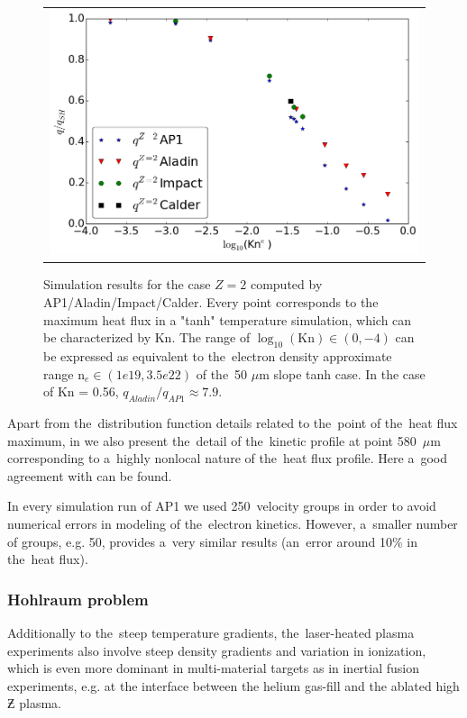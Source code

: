 \begin{figure}[tbh]
  \begin{center}
    \begin{tabular}{c}
      \includegraphics[width=\figscale\textwidth]{Kn_results.png}
    \end{tabular}
  \caption{  
  Simulation results for the case $Z=2$ computed by AP1/Aladin/Impact/Calder.
  Every point corresponds to the maximum heat flux in a "tanh" temperature 
  simulation, which can be characterized by Kn. The range of 
  $\log_{10}(\text{Kn})\in (0, -4)$ can be expressed as equivalent 
  to the~electron density approximate range n$_e \in (1e19, 3.5e22)$ of 
  the~50 $\mu$m slope tanh case. In the case of Kn = 0.56, 
  $q_{Aladin} / q_{AP1}\approx 7.9$.}
  \label{fig:Kn_results}
  \end{center} 
\end{figure}

Apart from the~distribution function details related to the~point of 
the~heat flux maximum, in 
we also present the~detail of the~kinetic profile at point 580~$\mu$m 
corresponding to a~highly nonlocal nature of the~heat flux profile. 
Here a~good agreement with \cite{Sherlock_PoP2017} can be found.

In every simulation run of AP1 we used 250~velocity groups in order to avoid
numerical errors in modeling of the~electron kinetics. However, a~smaller 
number of groups, e.g. 50, provides a~very similar results 
(an~error around 10$\%$ in the~heat flux).

\subsubsection{Hohlraum problem}
Additionally to the~steep temperature gradients, the~laser-heated plasma 
experiments also involve steep density gradients and variation in ionization,
which is even more dominant in multi-material targets as in inertial
fusion experiments, e.g. at the interface between the helium gas-fill and 
the ablated high $\Zbar$ plasma.

